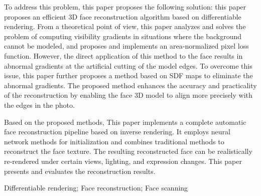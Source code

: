 \documentclass{scutmaster}
\begin{document}
To address this problem, this paper proposes the following solution:
this paper proposes an efficient 3D face reconstruction algorithm based on differentiable rendering.
From a theoretical point of view, this paper analyzes and solves the problem of computing visibility gradients in situations where the background cannot be modeled,
and proposes and implements an area-normalized pixel loss function.
However, the direct application of this method to the face results in abnormal gradients at the artificial cutting of the model edges.
To overcome this issue, this paper further proposes a method based on SDF maps to eliminate the abnormal gradients.
The proposed method enhances the accuracy and practicality of the reconstruction
by enabling the face 3D model to align more precisely with the edges in the photo.

Based on the proposed methods, This paper implements a complete automatic face reconstruction pipeline based on inverse rendering.
It employs neural network methods for initialization and combines traditional methods to reconstruct the face texture.
The resulting reconstructed face can be realistically re-rendered under certain views, lighting, and expression changes.
This paper presents and evaluates the reconstruction results.

 Differentiable rendering; Face reconstruction; Face scanning

\tableofcontents

\listoffigures

\listoftables

\mainmatter







\end{document}
